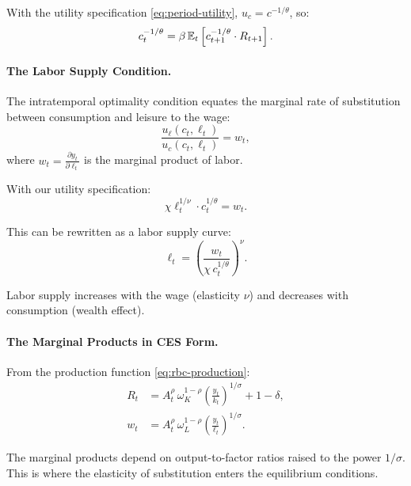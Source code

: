 With the utility specification \cref{eq:period-utility}, $u_c = c^{-1/\theta}$, so:
\begin{equation}
c_t^{-1/\theta} = \beta \, \mathbb{E}_t \left[ c_{t+1}^{-1/\theta} \cdot R_{t+1} \right].
\label{eq:euler-crra}
\end{equation}

\paragraph{The Labor Supply Condition.}
The intratemporal optimality condition equates the marginal rate of substitution between consumption and leisure to the wage:
\begin{equation}
\frac{u_\ell(c_t, \ell_t)}{u_c(c_t, \ell_t)} = w_t,
\label{eq:labor-supply}
\end{equation}
where $w_t = \frac{\partial y_t}{\partial \ell_t}$ is the marginal product of labor.

With our utility specification:
\begin{equation}
\chi \ell_t^{1/\nu} \cdot c_t^{1/\theta} = w_t.
\label{eq:labor-supply-explicit}
\end{equation}

This can be rewritten as a labor supply curve:
\begin{equation}
\ell_t = \left( \frac{w_t}{\chi \, c_t^{1/\theta}} \right)^\nu.
\label{eq:labor-supply-curve}
\end{equation}

Labor supply increases with the wage (elasticity $\nu$) and decreases with consumption (wealth effect).

\paragraph{The Marginal Products in CES Form.}
From the production function \cref{eq:rbc-production}:
\begin{align}
R_t &= A_t^\rho \, \omega_K^{1-\rho} \left( \frac{y_t}{k_t} \right)^{1/\sigma} + 1 - \delta, \label{eq:return-ces} \\[6pt]
w_t &= A_t^\rho \, \omega_L^{1-\rho} \left( \frac{y_t}{\ell_t} \right)^{1/\sigma}. \label{eq:wage-ces}
\end{align}

The marginal products depend on output-to-factor ratios raised to the power $1/\sigma$. This is where the elasticity of substitution enters the equilibrium conditions.

